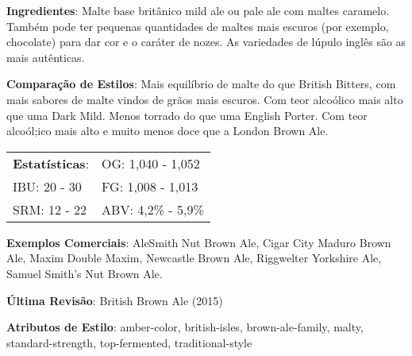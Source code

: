 \textbf{Ingredientes}: Malte base britânico mild ale ou pale ale com maltes caramelo. Também pode ter pequenas quantidades de maltes mais escuros (por exemplo, chocolate) para dar cor e o caráter de nozes. As variedades de lúpulo inglês são as mais autênticas.

\textbf{Comparação de Estilos}: Mais equilíbrio de malte do que British Bitters, com mais sabores de malte vindos de grãos mais escuros. Com teor alcoólico mais alto que uma Dark Mild. Menos torrado do que uma English Porter. Com teor alcoól;ico mais alto e muito menos doce que a London Brown Ale.

\begin{tabular}{@{}p{35mm}p{35mm}@{}}
  \textbf{Estatísticas}: & OG: 1,040 - 1,052 \\
  IBU: 20 - 30  & FG: 1,008 - 1,013  \\
  SRM: 12 - 22  & ABV: 4,2\% - 5,9\%
\end{tabular}

\textbf{Exemplos Comerciais}: AleSmith Nut Brown Ale, Cigar City Maduro Brown Ale, Maxim Double Maxim, Newcastle Brown Ale, Riggwelter Yorkshire Ale, Samuel Smith’s Nut Brown Ale.

\textbf{Última Revisão}: British Brown Ale (2015)

\textbf{Atributos de Estilo}: amber-color, british-isles, brown-ale-family, malty, standard-strength, top-fermented, traditional-style
